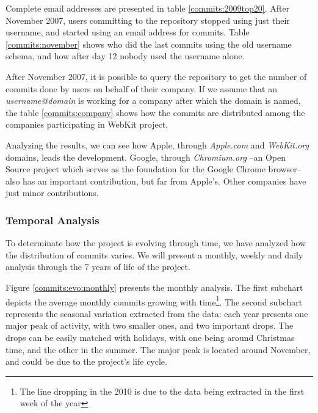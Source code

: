 

Complete email addresses are presented in table \ref{commits:2009top20}. After November 2007, users committing to the repository stopped using just their username, and started using an email address for commits. Table \ref{commits:november} shows who did the last commits using the old username schema, and how after day 12 nobody used the username alone.



After November 2007, it is possible to query the repository to get the number of commits done by users on behalf of their company. If we assume that an {\it username@domain} is working for a company after which the domain is named, the table \ref{commits:company} shows how the commits are distributed among the companies participating in WebKit project. 

Analyzing the results, we can see how Apple, through {\it Apple.com} and {\it WebKit.org} domains, leads the development. Google, through {\it Chromium.org} --an Open Source project which serves as the foundation for the Google Chrome browser-- also has an important contribution, but far from Apple's. Other companies have just minor contributions.



\subsubsection{Temporal Analysis}

To determinate how the project is evolving through time, we have analyzed how the distribution of commits varies. We will present a monthly, weekly and daily analysis through the 7 years of life of the project. 

Figure \ref{commits:evo:monthly} presents the monthly analysis. The first subchart depicts the average monthly commits growing with time\footnote{The line dropping in the 2010 is due to the data being extracted in the first week of the year}. The second subchart represents the seasonal variation extracted from the data: each year presents one major peak of activity, with two smaller ones, and two important drops. 
The drops can be easily matched with holidays, with one being around Christmas time, and the other in the summer. The major peak is located around November, and could be due to the project's life cycle.  


